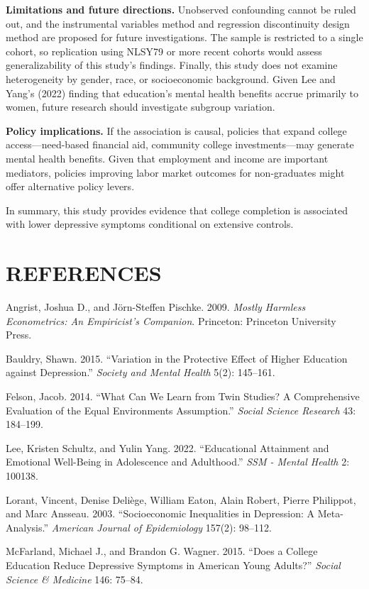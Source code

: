 \documentclass[
  12pt,
]{article}
\begin{document}
\textbf{Limitations and future directions.} Unobserved confounding
cannot be ruled out, and the instrumental variables method and
regression discontinuity design method are proposed for future
investigations. The sample is restricted to a single cohort, so
replication using NLSY79 or more recent cohorts would assess
generalizability of this study's findings. Finally, this study does not
examine heterogeneity by gender, race, or socioeconomic background.
Given Lee and Yang's (2022) finding that education's mental health
benefits accrue primarily to women, future research should investigate
subgroup variation.

\textbf{Policy implications.} If the association is causal, policies
that expand college access---need-based financial aid, community college
investments---may generate mental health benefits. Given that employment
and income are important mediators, policies improving labor market
outcomes for non-graduates might offer alternative policy levers.

In summary, this study provides evidence that college completion is
associated with lower depressive symptoms conditional on extensive
controls.

\newpage

\section{REFERENCES}\label{references}

Angrist, Joshua D., and Jörn-Steffen Pischke. 2009. \emph{Mostly
Harmless Econometrics: An Empiricist's Companion}. Princeton: Princeton
University Press.

Bauldry, Shawn. 2015. ``Variation in the Protective Effect of Higher
Education against Depression.'' \emph{Society and Mental Health} 5(2):
145--161.

Felson, Jacob. 2014. ``What Can We Learn from Twin Studies? A
Comprehensive Evaluation of the Equal Environments Assumption.''
\emph{Social Science Research} 43: 184--199.

Lee, Kristen Schultz, and Yulin Yang. 2022. ``Educational Attainment and
Emotional Well-Being in Adolescence and Adulthood.'' \emph{SSM - Mental
Health} 2: 100138.

Lorant, Vincent, Denise Deliège, William Eaton, Alain Robert, Pierre
Philippot, and Marc Ansseau. 2003. ``Socioeconomic Inequalities in
Depression: A Meta-Analysis.'' \emph{American Journal of Epidemiology}
157(2): 98--112.

McFarland, Michael J., and Brandon G. Wagner. 2015. ``Does a College
Education Reduce Depressive Symptoms in American Young Adults?''
\emph{Social Science \& Medicine} 146: 75--84.
\end{document}
